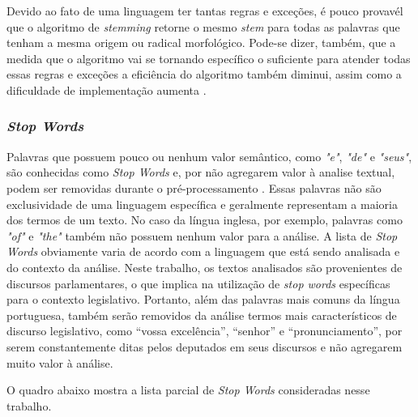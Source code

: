 Devido ao fato de uma linguagem ter tantas regras e exceções, é pouco provavél que o algoritmo de \textit{stemming} retorne o mesmo \textit{stem} para todas as palavras que tenham a mesma origem ou radical morfológico. Pode-se dizer, também, que a medida que o algoritmo vai se tornando específico o suficiente para atender todas essas regras e exceções a eficiência do algoritmo também diminui, assim como a dificuldade de implementação aumenta \cite{imamura2001}.

\subsubsection{\textit{Stop Words}}
\label{ssub:stop_words}

Palavras que possuem pouco ou nenhum valor semântico, como \textit{"e"}, \textit{"de"} e \textit{"seus"}, são conhecidas como \textit{Stop Words} e, por não agregarem valor à analise textual, podem ser removidas durante o pré-processamento \cite{rajaraman2011}. Essas palavras não são exclusividade de uma linguagem específica e geralmente representam a maioria dos termos de um texto. No caso da língua inglesa, por exemplo, palavras como \textit{"of"} e \textit{"the"} também não possuem nenhum valor para a análise. A lista de \textit{Stop Words} obviamente varia de acordo com a linguagem que está sendo analisada \cite{lopes2015} e do contexto da análise. Neste trabalho, os textos analisados são provenientes de discursos parlamentares, o que implica na utilização de \textit{stop words} específicas para o contexto legislativo. Portanto, além das palavras mais comuns da língua portuguesa, também serão removidos da análise termos mais característicos de discurso legislativo, como ``vossa excelência'', ``senhor'' e ``pronunciamento'', por serem constantemente ditas pelos deputados em seus discursos e não agregarem muito valor à análise.

O quadro abaixo mostra a lista parcial de \textit{Stop Words} consideradas nesse trabalho.

